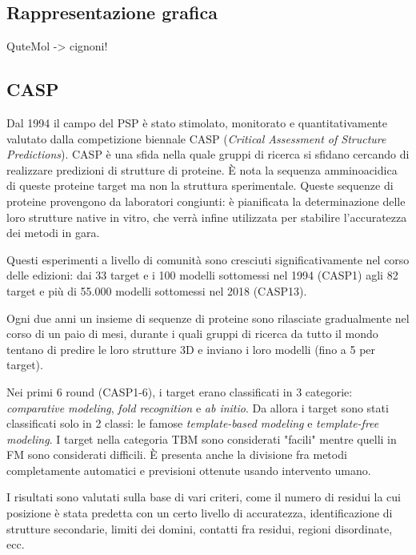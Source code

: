 


\subsection{Rappresentazione grafica}

QuteMol -> cignoni!

\subsection{CASP} \label{sec:CASP}
{
Dal 1994 il campo del PSP è stato stimolato, monitorato e quantitativamente valutato dalla competizione biennale CASP (\textit{Critical Assessment of Structure Predictions}). CASP è una sfida nella quale gruppi di ricerca si sfidano cercando di realizzare predizioni di strutture di proteine. È nota la sequenza amminoacidica di queste proteine target ma non la struttura sperimentale. Queste sequenze di proteine provengono da laboratori  congiunti: è pianificata la determinazione delle loro strutture native in vitro, che verrà infine utilizzata per stabilire l'accuratezza dei metodi in gara.

\par Questi esperimenti a livello di comunità sono cresciuti significativamente nel corso delle edizioni: dai 33 target e i 100 modelli sottomessi nel 1994 (CASP1) agli 82 target e più di 55.000 modelli sottomessi nel 2018 (CASP13)\supercite{abbass2020enhancing}.

\par Ogni due anni un insieme di sequenze di proteine sono rilasciate gradualmente nel corso di un paio di mesi, durante i quali gruppi di ricerca da tutto il mondo tentano di predire le loro strutture 3D e inviano i loro modelli (fino a 5 per target).

\par Nei primi 6 round (CASP1-6), i target erano classificati in 3 categorie: \textit{comparative modeling}, \textit{fold recognition} e \textit{ab initio}. Da allora i target sono stati classificati solo in 2 classi: le famose \textit{template-based modeling} e \textit{template-free modeling}. I target nella categoria TBM sono considerati "facili" mentre quelli in FM sono considerati difficili. È presenta anche la divisione fra metodi completamente automatici e previsioni ottenute usando intervento umano.

\par I risultati sono valutati sulla base di vari criteri, come il numero di residui la cui posizione è stata predetta con un certo livello di accuratezza, identificazione di strutture secondarie, limiti dei domini, contatti fra residui, regioni disordinate, ecc.

}
